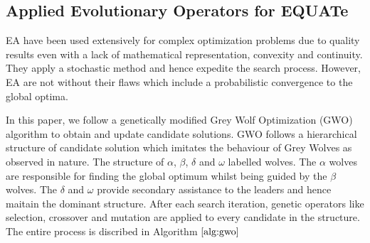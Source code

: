\documentclass[conference]{IEEEtran}
\begin{document}
\subsection{Applied Evolutionary Operators for EQUATe}

EA have been used extensively for complex optimization problems due to quality results even with a lack of mathematical representation, convexity and continuity. They apply a stochastic method and hence expedite the search process. However, EA are not without their flaws which include a probabilistic convergence to the global optima. 

In this paper, we follow a genetically modified Grey Wolf Optimization (GWO) algorithm \cite{gwo} to obtain and update candidate solutions. GWO follows a hierarchical structure of candidate solution which imitates the behaviour of Grey Wolves as observed in nature. The structure of $\alpha$, $\beta$, $\delta$ and $\omega$ labelled wolves. The $\alpha$ wolves are responsible for finding the global optimum whilst being guided by the $\beta$ wolves. The $\delta$ and $\omega$ provide secondary assistance to the leaders and hence maitain the dominant structure. After each search iteration, genetic operators like selection, crossover and mutation are applied to every candidate in the structure. The entire process is discribed in Algorithm $\ref{alg:gwo}$
\end{document}

